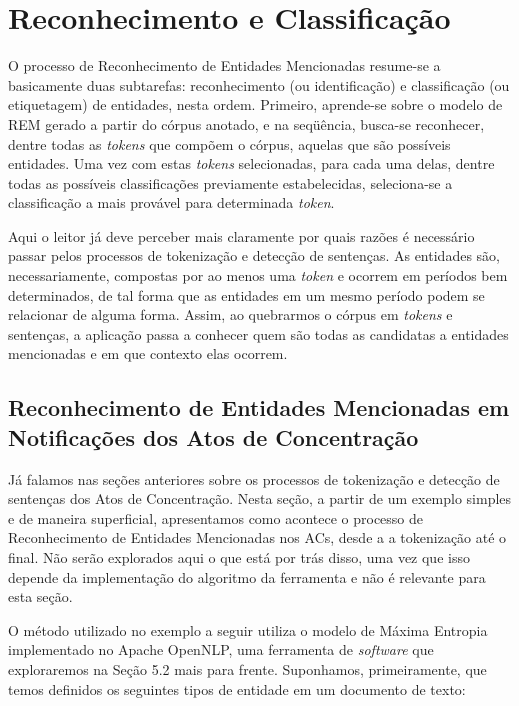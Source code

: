 \documentclass[11pt]{report}
\begin{document}
\section{Reconhecimento e Classificação}

\indent\indent O processo de Reconhecimento de Entidades Mencionadas resume-se a basicamente duas subtarefas: reconhecimento (ou identificação) e classificação (ou etiquetagem)
de entidades, nesta ordem. Primeiro, aprende-se sobre o modelo de REM gerado a partir do córpus anotado, e na seqüência, busca-se reconhecer, dentre todas as \textit{tokens}
que compõem o córpus, aquelas que são possíveis entidades. Uma vez com estas \textit{tokens} selecionadas, para cada uma delas, dentre todas as possíveis classificações
previamente estabelecidas, seleciona-se a classificação a mais provável para determinada \textit{token}.

Aqui o leitor já deve perceber mais claramente por quais razões é necessário passar pelos processos de tokenização e detecção de sentenças. As entidades são, necessariamente,
compostas por ao menos uma \textit{token} e ocorrem em períodos bem determinados, de tal forma que as entidades em um mesmo período podem se relacionar de alguma forma. Assim,
ao quebrarmos o córpus em \textit{tokens} e sentenças, a aplicação passa a conhecer quem são todas as candidatas a entidades mencionadas e em que contexto elas ocorrem.

\subsection{Reconhecimento de Entidades Mencionadas em Notificações dos Atos de Concentração}

\indent\indent Já falamos nas seções anteriores sobre os processos de tokenização e detecção de sentenças dos Atos de Concentração. Nesta seção, a partir de um exemplo simples e
de maneira superficial, apresentamos como acontece o processo de Reconhecimento de Entidades Mencionadas nos ACs, desde a a tokenização até o final. Não serão explorados aqui
o que está por trás disso, uma vez que isso depende da implementação do algoritmo da ferramenta e não é relevante para esta seção. 

O método utilizado no exemplo a seguir utiliza o modelo de Máxima Entropia implementado no Apache OpenNLP, uma ferramenta de \textit{software} que exploraremos na Seção 5.2 mais para frente.
Suponhamos, primeiramente, que temos definidos os seguintes tipos de entidade em um documento de texto:
\end{document}
